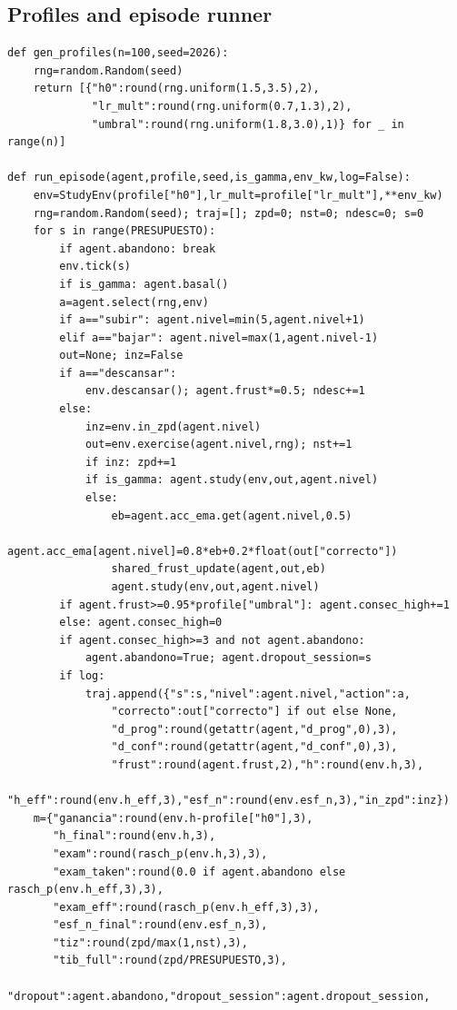 \documentclass{article}
\begin{document}
\subsection{Profiles and episode runner}
\begin{verbatim}
def gen_profiles(n=100,seed=2026):
    rng=random.Random(seed)
    return [{"h0":round(rng.uniform(1.5,3.5),2),
             "lr_mult":round(rng.uniform(0.7,1.3),2),
             "umbral":round(rng.uniform(1.8,3.0),1)} for _ in range(n)]

def run_episode(agent,profile,seed,is_gamma,env_kw,log=False):
    env=StudyEnv(profile["h0"],lr_mult=profile["lr_mult"],**env_kw)
    rng=random.Random(seed); traj=[]; zpd=0; nst=0; ndesc=0; s=0
    for s in range(PRESUPUESTO):
        if agent.abandono: break
        env.tick(s)
        if is_gamma: agent.basal()
        a=agent.select(rng,env)
        if a=="subir": agent.nivel=min(5,agent.nivel+1)
        elif a=="bajar": agent.nivel=max(1,agent.nivel-1)
        out=None; inz=False
        if a=="descansar":
            env.descansar(); agent.frust*=0.5; ndesc+=1
        else:
            inz=env.in_zpd(agent.nivel)
            out=env.exercise(agent.nivel,rng); nst+=1
            if inz: zpd+=1
            if is_gamma: agent.study(env,out,agent.nivel)
            else:
                eb=agent.acc_ema.get(agent.nivel,0.5)
                agent.acc_ema[agent.nivel]=0.8*eb+0.2*float(out["correcto"])
                shared_frust_update(agent,out,eb)
                agent.study(env,out,agent.nivel)
        if agent.frust>=0.95*profile["umbral"]: agent.consec_high+=1
        else: agent.consec_high=0
        if agent.consec_high>=3 and not agent.abandono:
            agent.abandono=True; agent.dropout_session=s
        if log:
            traj.append({"s":s,"nivel":agent.nivel,"action":a,
                "correcto":out["correcto"] if out else None,
                "d_prog":round(getattr(agent,"d_prog",0),3),
                "d_conf":round(getattr(agent,"d_conf",0),3),
                "frust":round(agent.frust,2),"h":round(env.h,3),
                "h_eff":round(env.h_eff,3),"esf_n":round(env.esf_n,3),"in_zpd":inz})
    m={"ganancia":round(env.h-profile["h0"],3),
       "h_final":round(env.h,3),
       "exam":round(rasch_p(env.h,3),3),
       "exam_taken":round(0.0 if agent.abandono else rasch_p(env.h_eff,3),3),
       "exam_eff":round(rasch_p(env.h_eff,3),3),
       "esf_n_final":round(env.esf_n,3),
       "tiz":round(zpd/max(1,nst),3),
       "tib_full":round(zpd/PRESUPUESTO,3),
       "dropout":agent.abandono,"dropout_session":agent.dropout_session,

\end{verbatim}
\end{document}
